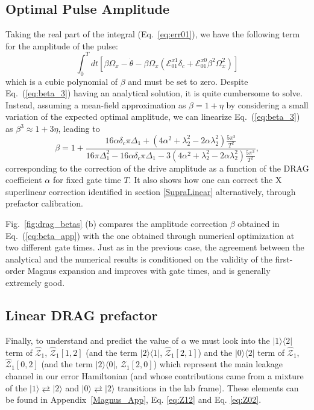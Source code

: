\documentclass[superscriptaddress,amsmath,amssymb,aps,twocolumn,praplied,notitlepage]{revtex4-2}
\newcommand{\ket}[1]{\vert #1 \rangle}
\begin{document}
\subsection{{Optimal Pulse Amplitude}}

 Taking the real part of the integral (Eq.~\eqref{eq:err01}), we have the following term for the amplitude of the pulse:
\begin{equation}
    \int_0^T dt\left[\beta\Omega_x-\dot{\theta}-\beta\Omega_x(\mathcal{E}^{x1}_{01}\delta_c+\mathcal{E}^{x0}_{01}\beta^2\Omega_x^2)\right]
    \label{eq:beta_3}
\end{equation}
which is a cubic polynomial of $\beta$ and must be set to zero.
Despite Eq.~(\ref{eq:beta_3}) having an analytical solution, it is quite cumbersome to solve. Instead, assuming a mean-field approximation as $\beta=1+\eta$ by considering a small variation of the expected optimal amplitude, we can linearize Eq.~(\ref{eq:beta_3}) as $\beta^3\approx1+3\eta$, leading to
\begin{equation}
    \beta =1 +\frac{16\alpha\delta_c\pi\Delta_1+(4\alpha^2+\lambda_2^2-2\alpha\lambda_2^2)\frac{5\pi^3}{T^2}}{16\pi\Delta_1^2-16\alpha\delta_c\pi\Delta_1-3(4\alpha^2+\lambda_2^2-2\alpha\lambda_2^2)\frac{5\pi^3}{T^2}},
    \label{eq:beta_app}
\end{equation}
corresponding to the correction of the drive amplitude as a function of the DRAG coefficient $\alpha$ for fixed gate time $T$. It also shows how one can correct the X superlinear correction identified in section \ref{SupraLinear} alternatively, through prefactor calibration.



Fig.~\ref{fig:drag_betas} (b) compares the amplitude correction $\beta$ obtained in Eq.~(\ref{eq:beta_app}) with the one obtained through numerical optimization at two different gate times. Just as in the previous case, the agreement between the analytical and the numerical results is conditioned on the validity of the first-order Magnus expansion and improves with gate times, and is generally extremely good. 


\subsection{Linear DRAG prefactor}\label{alpha_pred}


Finally, to understand and predict the value of $\alpha$ we must look into {the $|1\rangle\langle 2|$ term of $\hat{\mathcal{Z}}_{1}$, $\hat{\mathcal{Z}}_{1}[1,2]$ (and the term $|2\rangle\langle1|$,  $\hat{\mathcal{Z}}_{1}[2,1]$) and the $|0\rangle\langle 2|$ term of $\hat{\mathcal{Z}}_{1}$, $\hat{\mathcal{Z}}_{1}[0,2]$ (and the term $|2\rangle\langle0|$, $\hat{\mathcal{Z}}_{1}[2,0]$)} which represent the main leakage channel in our error Hamiltonian (and whose contributions came from a mixture of the $\ket{1}\rightleftarrows\ket{2}$ and $\ket{0}\rightleftarrows\ket{2}$ transitions in the lab frame). These elements can be found in Appendix~\ref{Magnus_App}, Eq. \ref{eq:Z12} and Eq. \ref{eq:Z02}.
\end{document}
